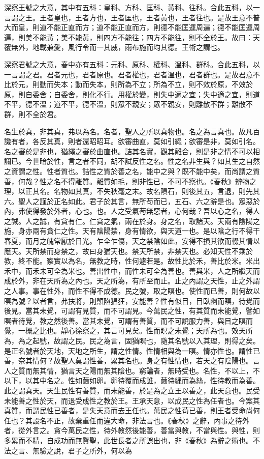 深察王號之大意，其中有五科：皇科、方科、匡科、黃科、往科。合此五科，以一言謂之王。王者皇也，王者方也，王者匡也，王者黃也，王者往也。是故王意不普大而皇，則道不能正直而方；道不能正直而方，則德不能匡運周遍；德不能匡運周遍，則美不能黃；美不能黃，則四方不能往；四方不能往，則不全於王。故曰：天覆無外，地載兼愛，風行令而一其威，雨布施而均其德。王術之謂也。


深察君號之大意，春中亦有五科：元科、原科、權科、溫科、群科。合此五科，以一言謂之君。君者元也，君者原也。君者權也，君者溫也，君者群也。是故君意不比於元，則動而失本；動而失本，則所為不立；所為不立，則不效於原，不效於原，則自委舍；自委舍，則化不行。用權於變，則失中適之宜；失中適之宜，則道不平，德不溫；道不平，德不溫，則眾不親安；眾不親安，則離散不群；離散不群，則不全於君。


名生於真，非其真，弗以為名。名者，聖人之所以真物也。名之為言真也。故凡百譏有者，各反其真，則者還昭昭耳。欲審曲直，莫如引繩；欲審是非，莫如引名。名之審於是非也，猶繩之審於曲直也。詰其名實，觀其離合，則是非之情不可以相讕已。今世暗於性，言之者不同，胡不試反性之名。性之名非生與？如其生之自然之資謂之性。性者質也。詰性之質於善之名，能中之與？既不能中矣，而尚謂之質善，何哉？性之名不得離質。離質如毛，則非性已，不可不察也。《春秋》辨物之理，以正其名。名物如其真，不失秋毫之末。故名隕石，則後其五，言退，則先其六。聖人之謹於正名如此。君子於其言，無所苟而已，五石、六之辭是也。眾惡於內，弗使得發於外者，心也。也。人之受氣苟無惡者，心何哉？吾以心之名，得人之誠。人之誠，有貪有仁。仁貪之氣，兩在於身。身之名，取諸天。天兩有陰陽之施，身亦兩有貪仁之性。天有陰陽禁，身有情欲，與天道一也。是以陰之行不得干春夏，而月之魄常厭於日光。乍全乍傷，天之禁陰如此，安得不損其欲而輟其情以應天。天所禁而身禁之，故曰身猶天也。禁天所禁，非禁天也。必知天性不乘於教，終不能。察實以為名，無教之時，性何遽若是。故性比於禾，善比於米。米出禾中，而禾未可全為米也。善出性中，而性未可全為善也。善與米，人之所繼天而成於外，非在天所為之內也。天之所為，有所至而止。止之內謂之天性，止之外謂之人事。事在性外，而性不得不成德。民之號，取之瞑也。使性而已善，則何故以瞑為號？以者言，弗扶將，則顛陷猖狂，安能善？性有似目，目臥幽而瞑，待覺而後見。當其未覺，可謂有見質，而不可謂見。今萬民之性，有其質而未能覺，譬如瞑者待覺，教之然後善。當其未覺，可謂有善質，而不可說服力善，與目之瞑而覺，一概之比也。靜心徐察之，其言可見矣。性而瞑之未覺；天所為也。效天所為，為之起號，故謂之民。民之為言，固猶瞑也，隨其名號以入其理，則得之矣。是正名號者於天地，天地之所生，謂之性情。性情相與為一瞑。情亦性也。謂性已善，奈其情何？故聖人莫謂性善，累其名也。身之有性情也，若天之有陰陽也。言人之質而無其情，猶言天之陽而無其陰也。窮論者，無時受也。名性，不以上，不以下，以其中名之。性如繭如卵。卵待覆而成誰，繭待繅而為絲，性待教而為善。此之謂真天。天生民性有善質，而未能善，於是為之立王以善之，此天意也。民受未能善之性於天，而退受成性之教於王。王承天意，以成民之性為任者也。今案其真質，而謂民性已善者，是失天意而去王任也。萬民之性苟已善，則王者受命尚何任也？其設名不正，故棄重任而違大命，非法言也。《春秋》之辭，內事之待外者，從外言之。貪今萬民之性，待外教然後能善，善當與教，不當與性。與性，則多累而不精，自成功而無賢聖，此世長者之所誤出也，非《春秋》為辭之術也。不法之言、無驗之說，君子之所外，何以為